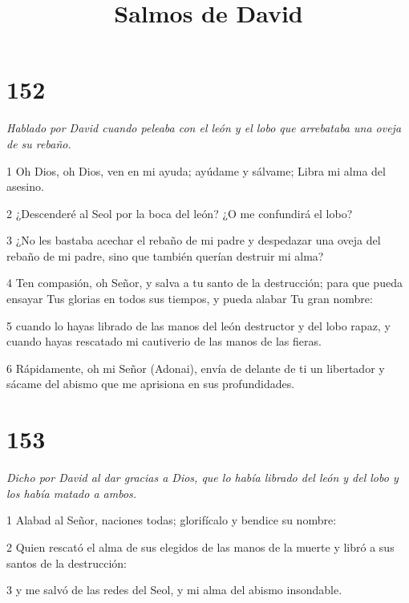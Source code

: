 

\title{Salmos de David}

\chapter{152}

\par \textit{Hablado por David cuando peleaba con el león y el lobo que arrebataba una oveja de su rebaño.}

\par 1 Oh Dios, oh Dios, ven en mi ayuda; ayúdame y sálvame; Libra mi alma del asesino.

\par 2 ¿Descenderé al Seol por la boca del león? ¿O me confundirá el lobo?

\par 3 ¿No les bastaba acechar el rebaño de mi padre y despedazar una oveja del rebaño de mi padre, sino que también querían destruir mi alma?

\par 4 Ten compasión, oh Señor, y salva a tu santo de la destrucción; para que pueda ensayar Tus glorias en todos sus tiempos, y pueda alabar Tu gran nombre:

\par 5 cuando lo hayas librado de las manos del león destructor y del lobo rapaz, y cuando hayas rescatado mi cautiverio de las manos de las fieras.

\par 6 Rápidamente, oh mi Señor (Adonai), envía de delante de ti un libertador y sácame del abismo que me aprisiona en sus profundidades.

\chapter{153}

\par \textit{Dicho por David al dar gracias a Dios, que lo había librado del león y del lobo y los había matado a ambos.}

\par 1 Alabad al Señor, naciones todas; glorifícalo y bendice su nombre:

\par 2 Quien rescató el alma de sus elegidos de las manos de la muerte y libró a sus santos de la destrucción:

\par 3 y me salvó de las redes del Seol, y mi alma del abismo insondable.

